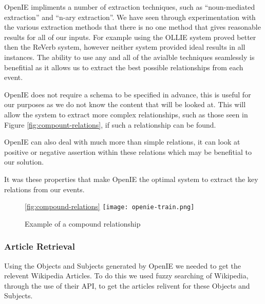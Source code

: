 \documentclass[bsc,frontabs,twoside,singlespacing,parskip,deptreport]{infthesis}     %
\begin{document}
OpenIE impliments a number of extraction techniques, such as ``noun-mediated extraction'' and ``n-ary extraction''.
We have seen through experimentation with the various
extraction methods that there is no one method that gives reasonable results for all of our inputs.
For example using the OLLIE system proved better then the ReVerb system, however neither system provided ideal results in all instances.%
The ability to use any and all of the avialble techniques seamlessly is benefitial as it allows us to
extract the best possible relationships from each event. 

OpenIE does not require a schema to be specified in advance, this is useful for our purposes
as we do not know the content that will be looked at. This will allow the system to extract
more complex relationships, such as those seen in Figure \ref{fig:compount-relations}, if such
a relationship can be found.

OpenIE can also deal with much more than simple relations,
it can look at positive or negative assertion within these relations which may be benefitial to our
solution.

It was these properties that make OpenIE the optimal system to extract the key relations from our events.


\begin{figure}[h]
  \centering
  \ref{fig:compound-relations}
  \texttt{[image: openie-train.png]}
  \caption{Example of a compound relationship }%
  \end{figure}

\subsubsection{Article Retrieval}
Using the Objects and Subjects generated by OpenIE we needed to get the relevent Wikipedia Articles.
To do this we used fuzzy searching of Wikipedia, through the use of their API, to get the articles relivent
for these Objects and Subjects.
\end{document}
